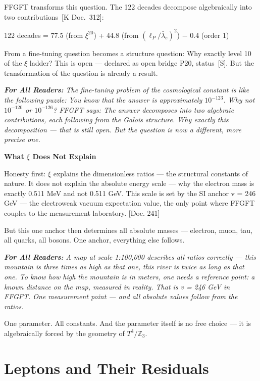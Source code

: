 \documentclass[11pt,oneside]{book}
\newcommand{\status}[1]{\penalty10000\,{\scriptsize\textcolor{gray!60}{[#1]}}}
\newenvironment{laierspur}{%
  \par\vspace{4pt}%
  \noindent\small\itshape\color{blue!60!black}%
  \textbf{For All Readers:}\enspace\ignorespaces}{%
  \par\vspace{4pt}\normalsize\normalfont\normalcolor}
\begin{document}
FFGFT transforms this question. The 122 decades decompose algebraically
into two contributions \status{K Doc.~312}:

122 decades = 77.5 (from $\xi^{20}$) + 44.8 (from $(\ell_P/\bar{\lambda}_e)^2$) $-$ 0.4 (order 1)

From a fine-tuning question becomes a structure question: Why exactly level
10 of the $\xi$ ladder? This is open — declared as open bridge P20, status \status{S}.
But the transformation of the question is already a result.

\begin{laierspur}
The fine-tuning problem of the cosmological constant is like the
following puzzle: You know that the answer is approximately $10^{-123}$.
Why not $10^{-120}$ or $10^{-126}$? FFGFT says: The answer decomposes into two
algebraic contributions, each following from the Galois structure. Why
exactly this decomposition — that is still open. But the question is now a
different, more precise one.
\end{laierspur}

\textbf{What $\xi$ Does Not Explain}

Honesty first: $\xi$ explains the dimensionless ratios — the structural
constants of nature. It does not explain the absolute energy scale — why the
electron mass is exactly 0.511 MeV and not 0.511 GeV. This scale is set by
the SI anchor v = 246 GeV — the electroweak vacuum expectation value, the
only point where FFGFT couples to the measurement laboratory. [Doc. 241]

But this one anchor then determines all absolute masses — electron, muon,
tau, all quarks, all bosons. One anchor, everything else follows.

\begin{laierspur}
A map at scale 1:100,000 describes all ratios correctly — this mountain
is three times as high as that one, this river is twice as long as that one.
To know how high the mountain is in meters, one needs a reference point: a
known distance on the map, measured in reality. That is v = 246 GeV in
FFGFT. One measurement point — and all absolute values follow from the
ratios.
\end{laierspur}

One parameter. All constants. And the parameter itself is no free choice —
it is algebraically forced by the geometry of $T^4/\mathbb{Z}_3$.


\chapter{Leptons and Their Residuals}
\end{document}
